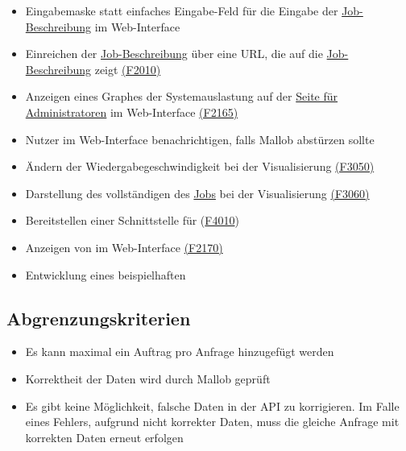 \begin{itemize}[noitemsep]
        \item Eingabemaske statt einfaches Eingabe-Feld für die Eingabe der \hyperref[B:Job-Beschreibung]{Job-Beschreibung} im \gls{Web-Interface}
        \item Einreichen der \hyperref[B:Job-Beschreibung]{Job-Beschreibung} über eine \gls{URL}, die auf die \hyperref[B:Job-Beschreibung]{Job-Beschreibung} zeigt \hyperref[FA:Web-Interface:Job einreichen]{(F2010)}
        \item Anzeigen eines Graphes der Systemauslastung auf der \hyperref[pages:admin]{Seite für Administratoren} im \gls{Web-Interface} \hyperref[FA:Web-Interface:Anzeigen von Diagnosedaten]{(F2165)}
        \item \gls{Nutzer} im \gls{Web-Interface} benachrichtigen, falls \gls{Mallob} abstürzen sollte 
        \item Ändern der Wiedergabegeschwindigkeit bei der Visualisierung \hyperref[FA:Visualisierung:Aendern der Wiedergabegeschwindigkeit]{(F3050)}
        \item Darstellung des vollständigen  des \hyperref[B:Jobs]{Jobs} bei der Visualisierung \hyperref[FA:Visualisierung:Anzeigen des Binaerbaumes für einen Job]{(F3060)}
        \item Bereitstellen einer Schnittstelle für  (\hyperref[FA:System:Schnittstelle für Plugins]{F4010})
        \item Anzeigen von  im \gls{Web-Interface} \hyperref[FA:Web-Interface:Anzeigen von Plugins]{(F2170)}
        \item Entwicklung eines beispielhaften 
    \end{itemize}
    
\subsection{Abgrenzungskriterien}
    \begin{itemize}[noitemsep]
        \item Es kann maximal ein Auftrag pro Anfrage hinzugefügt werden
        \item Korrektheit der Daten wird durch \gls{Mallob} geprüft
        \item Es gibt keine Möglichkeit, falsche Daten in der \gls{API} zu korrigieren. Im Falle eines Fehlers, aufgrund nicht korrekter Daten, muss die gleiche Anfrage mit korrekten Daten erneut erfolgen
    \end{itemize}

